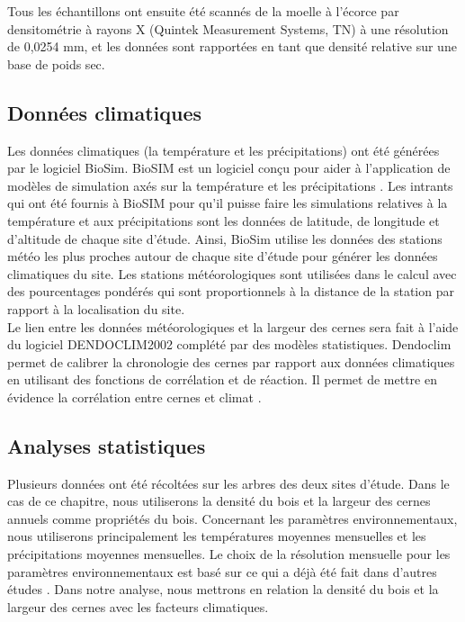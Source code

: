 \documentclass[a4paper,12pt]{report}
\begin{document}
Tous les échantillons ont ensuite été scannés de la moelle à l'écorce par densitométrie à rayons X (Quintek Measurement Systems, TN) à une résolution de 0,0254 mm, et les données sont rapportées en tant que densité relative sur une base de poids sec. %


\subsection*{Données climatiques}
Les données climatiques (la température et les précipitations) ont été générées par le logiciel BioSim. BioSIM est un logiciel conçu pour aider à l'application de modèles de simulation axés sur la température et les précipitations \citep{Regniere2014}. Les intrants qui ont été fournis à BioSIM pour qu'il puisse faire les simulations relatives à la température et aux précipitations sont les données de latitude, de longitude et d'altitude de chaque site d'étude. Ainsi, BioSim utilise les données des stations météo les plus proches autour de chaque site d'étude pour générer les données climatiques du site. Les stations météorologiques sont utilisées dans le calcul avec des pourcentages pondérés qui sont proportionnels à la distance de la station par rapport à la localisation du site.\\ 

Le lien entre les données météorologiques et la largeur des cernes sera fait à l'aide du logiciel DENDOCLIM2002 complété par des modèles statistiques. Dendoclim permet de calibrer la chronologie des cernes par rapport aux données climatiques en utilisant des fonctions de corrélation et de réaction. Il permet de mettre en évidence la corrélation entre cernes et climat \citep{Biondi2004}. 

\subsection*{Analyses statistiques}
Plusieurs données ont été récoltées sur les arbres des deux sites d'étude. Dans le cas de ce chapitre, nous utiliserons la densité du bois et la largeur des cernes annuels comme propriétés du bois. Concernant les paramètres environnementaux, nous utiliserons principalement les températures moyennes mensuelles et les précipitations moyennes mensuelles. Le choix de la résolution mensuelle pour les paramètres environnementaux est basé sur ce qui a déjà été fait dans d'autres études \citep{Franceschini2017}. Dans notre analyse, nous mettrons en relation la densité du bois et la largeur des cernes avec les facteurs climatiques. \\
\end{document}
